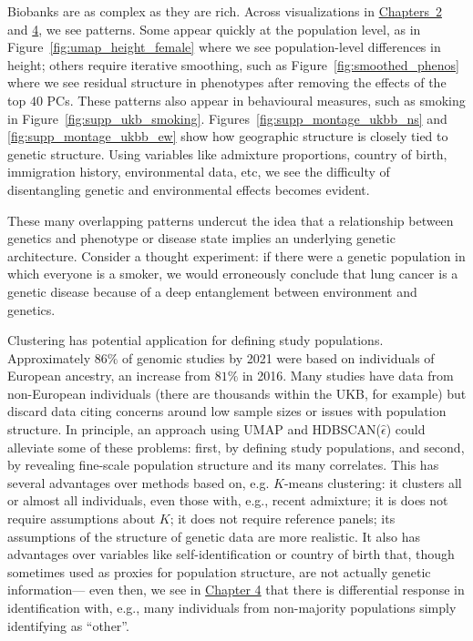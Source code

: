 Biobanks are as complex as they are rich. Across visualizations in \hyperref[chap:chapter2]{Chapters~2} and \hyperref[chap:chapter4]{4}, we see patterns. Some appear quickly at the population level, as in Figure~\ref{fig:umap_height_female} where we see population-level differences in height; others require iterative smoothing, such as  Figure~\ref{fig:smoothed_phenos} where we see residual structure in phenotypes after removing the effects of the top $40$ PCs. These patterns also appear in behavioural measures, such as smoking in Figure~\ref{fig:supp_ukb_smoking}. Figures~\ref{fig:supp_montage_ukbb_ns} and \ref{fig:supp_montage_ukbb_ew} show how geographic structure is closely tied to genetic structure. Using variables like admixture proportions, country of birth, immigration history, environmental data, etc, we see the difficulty of disentangling genetic and environmental effects becomes evident.

These many overlapping patterns  undercut the idea that a relationship between genetics and phenotype or disease state implies an underlying genetic architecture. Consider a thought experiment\citep{rose_sick_2001}: if there were a genetic population in which everyone is a smoker, we would erroneously conclude that lung cancer is a genetic disease because of a deep entanglement between environment and genetics. 

Clustering has potential application for defining study populations. Approximately $86\%$ of genomic studies by 2021 were based on individuals of European ancestry, an increase from $81\%$ in 2016\citep{fatumo_roadmap_2022,kaplan_polygenic_2022}. Many studies have data from non-European individuals (there are thousands within the UKB, for example) but discard data citing concerns around low sample sizes or issues with population structure\citep{ben-eghan_dont_2020}. In principle, an approach using UMAP and HDBSCAN($\hat{\epsilon}$) could alleviate some of these problems: first, by defining study populations, and second, by revealing fine-scale population structure and its many correlates. This has several advantages over methods based on, e.g. $K$-means clustering: it clusters all or almost all individuals, even those with, e.g., recent admixture; it is does not require assumptions about $K$; it does not require reference panels; its assumptions of the structure of genetic data are more realistic. It also has advantages over variables like self-identification or country of birth that, though sometimes used as proxies for population structure, are not actually genetic information--- even then, we see in \hyperref[chap:chapter4]{Chapter 4} that there is differential response in identification with, e.g., many individuals from non-majority populations simply identifying as ``other''.

